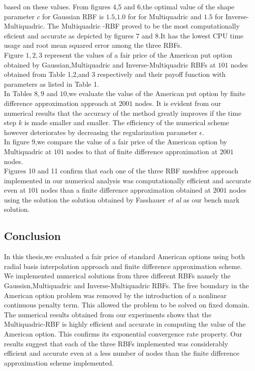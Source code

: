\documentclass[12pt]{article}
\numberwithin{equation}{subsection} %
\begin{document}
   based on these values. From figures 4,5 and 6,the optimal value of
   the shape parameter $c$ for Gaussian RBF is $1.5$,$1.0$ for for
   Multiquadric and $1.5$ for Inverse-Multiquadric. The
   Multiquadric -RBF proved to be the most computationally eficient
   and accurate as depicted by figures $7$ and $8$.It has the lowest
   CPU time usage and root mean squared error among the three
   RBFs.\\
   Figure $1,2,3$ represent the values   of a fair price of the American put option obtained
by Gaussian,Multiquadric and Inverse-Multiquadric RBFs at $101$
nodes obtained from Table 1,2,and 3 respectively and their payoff
function with parameters as listed in Table 1.\\
 In Tables $ 8,9$ and $10$,we evaluate the value of the American put
 option by finite difference approximation approach at $2001$
 nodes. It is evident from our numerical results that the accuracy of
 the method greatly improves if the time step $k$ is made smaller
 and smaller. The efficiency of the numerical scheme however
 deteriorates by decreasing the  regularization parameter $\epsilon$.\\
  In figure 9,we compare the value of a fair price of the American
  option by Multiquadric at $101$ nodes to that of finite difference
  approximation at $2001$ nodes.\\
   Figures 10 and 11 confirm that each one of the three RBF meshfree
   approach implemented in our numerical analysis was
   computationally efficient and accurate even at $101$ nodes than a
   finite difference approximation  obtained at $2001$ nodes using
   the solution the solution obtained by Fasshauer \textit{et al}
   \cite{Fas02} as our bench mark solution.


\subsection{Conclusion}
In this thesis,we evaluated a fair price of standard American
options using both radial basis interpolation approach and finite
difference approximation scheme. We implemented numerical solutions
from three different RBFs namely the Gaussisn,Multiquadric and
Inverse-Multiquadric RBFs. The free boundary in the American option
problem was removed by the introduction of a nonlinear continuous
 penalty term. This allowed the problem to be solved on fixed domain.
 The numerical results obtained from our experiments
shows that  the Multiquadric-RBF  is highly efficient and accurate
in computing the value of the  American option. This  confirms its
exponential convergence rate property. Our results suggest that each
of the three RBFs implemented was considerably efficient and
accurate even at a less number of nodes than the finite difference
approximation scheme implemented.
\end{document}
